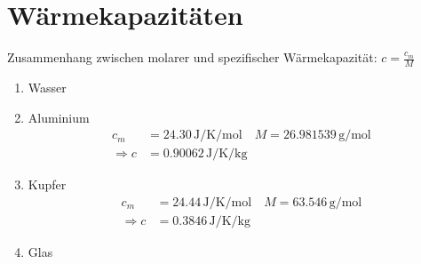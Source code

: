 \documentclass[a4paper]{article}
\begin{document}
\section{Wärmekapazitäten}
Zusammenhang zwischen molarer und spezifischer Wärmekapazität: 
$c = \frac{c_m}{M}$
\begin{enumerate}
	\item Wasser
	\item Aluminium
		\begin{align*}
			c_m &= 24.30 \, \si{\joule\per\kelvin\per\mol}
			\quad
			M = 26.981539 \, \si{\gram\per\mol} 
			\\
			\Rightarrow c &= 0.90062 \, \si{\joule\per\kelvin\per\kg}
		\end{align*}
	\item Kupfer
		\begin{align*}
			c_m &= 24.44 \, \si{\joule\per\kelvin\per\mol}
			\quad
			M = 63.546 \, \si{\gram\per\mol} 
			\\
			\Rightarrow c &= 0.3846 \, \si{\joule\per\kelvin\per\kg}
		\end{align*}
	\item Glas
\end{enumerate}
\end{document}
